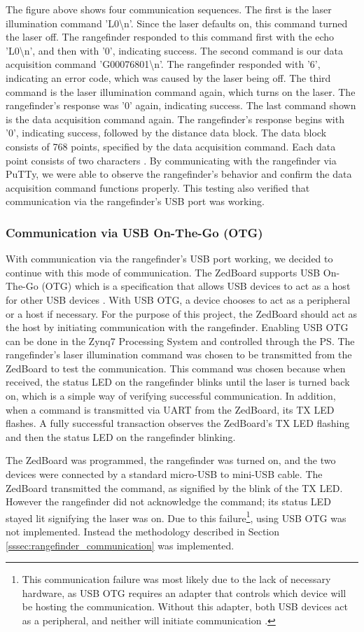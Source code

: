 The figure above shows four communication sequences. The first is the laser illumination command 'L0\textbackslash{}n'. Since the laser defaults on, this command turned the laser off. The rangefinder responded to this command first with the echo 'L0\textbackslash{}n', and then with '0', indicating success. The second command is our data acquisition command 'G00076801\textbackslash{}n'. The rangefinder responded with '6', indicating an error code, which was caused by the laser being off. The third command is the laser illumination command again, which turns on the laser. The rangefinder's response was '0' again, indicating success. The last command shown is the data acquisition command again. The rangefinder's response begins with '0', indicating success, followed by the distance data block. The data block consists of 768 points, specified by the data acquisition command. Each data point consists of two characters \cite{urg04lx_datasheet}. By communicating with the rangefinder via PuTTy, we were able to observe the rangefinder's behavior and confirm the data acquisition command functions properly. This testing also verified that communication via the rangefinder's USB port was working.

\subsubsection{Communication via USB On-The-Go (OTG)}
With communication via the rangefinder's USB port working, we decided to continue with this mode of communication. The ZedBoard supports USB On-The-Go (OTG) which is a specification that allows USB devices to act as a host for other USB devices \cite{usb-otg}. With USB OTG, a device chooses to act as a peripheral or a host if necessary. For the purpose of this project, the ZedBoard should act as the host by initiating communication with the rangefinder. Enabling USB OTG can be done in the Zynq7 Processing System and controlled through the PS. The rangefinder's laser illumination command was chosen to be transmitted from the ZedBoard to test the communication. This command was chosen because when received, the status LED on the rangefinder blinks until the laser is turned back on, which is a simple way of verifying successful communication. In addition, when a command is transmitted via UART from the ZedBoard, its TX LED flashes. A fully successful transaction observes the ZedBoard's TX LED flashing and then the status LED on the rangefinder blinking.
\par
The ZedBoard was programmed, the rangefinder was turned on, and the two devices were connected by a standard micro-USB to mini-USB cable. The ZedBoard transmitted the command, as signified by the blink of the TX LED. However the rangefinder did not acknowledge the command; its status LED stayed lit signifying the laser was on. Due to this failure\footnote{This communication failure was most likely due to the lack of necessary hardware, as USB OTG requires an adapter that controls which device will be hosting the communication. Without this adapter, both USB devices act as a peripheral, and neither will initiate communication \cite{usb-otg}.}, using USB OTG was not implemented. Instead the methodology described in Section \ref{sssec:rangefinder_communication} was implemented.

